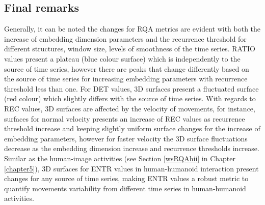 \newpage
\subsection{Final remarks}
Generally, it can be noted the changes for RQA metrics are evident
with both the increase of embedding dimension parameters and the 
recurrence threshold for different structures, window size, 
levels of smoothness of the time series. 
RATIO values present a plateau (blue colour surface) which is independently 
to the source of time series, however there are peaks that change 
differently based on the source of time series for increasing 
embedding parameters  with recurrence threshold less than one.
For DET values, 3D surfaces present a fluctuated surface (red colour)
which slightly differs with the source of time series.
With regards to REC values, 3D surfaces are affected by the velocity
of movements, for instance, surfaces for normal velocity presents 
an increase of REC values as recurrence threshold increase and keeping 
slightly uniform surface changes for the increase of embedding parameters, 
however for faster velocity the 3D surface fluctuations decrease as 
the embedding dimension increase and recurrence thresholds increase.
Similar as the human-image activities  
(see Section \ref{wsRQAhii} in Chapter \ref{chapter5}), 
3D surfaces for ENTR values in human-humanoid interaction  
present changes for any source of time series,
making ENTR values a robust metric to quantify movements variability 
from different time series in human-humanoid activities.








